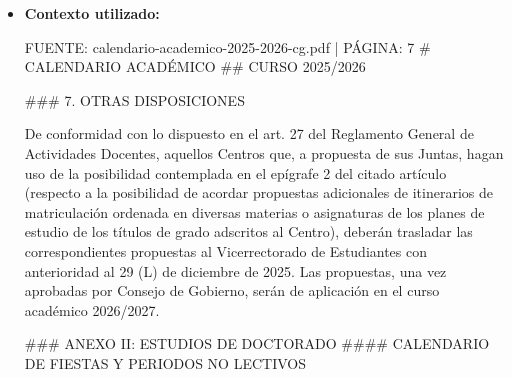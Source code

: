 \documentclass{article}
\begin{document}
\begin{itemize}
\begin{itemize}
                En el mes de abril de 2026, los días no lectivos o festivos en la Universidad de Sevilla debido a la conmemoración de la Semana Santa y la Feria de Abril son los siguientes:

                - \textbf{Del 29 de marzo al 5 de abril de 2026}: Estos días están considerados como no lectivos debido a la Semana Santa.
                - \textbf{Del 21 al 26 de abril de 2026}: Estos días están considerados como no lectivos debido a la Feria de Abril.

                Es importante tener en cuenta que estas fechas pueden estar sujetas a cambios o ajustes según las disposiciones específicas de la Universidad de Sevilla o las autoridades competentes. Sin embargo, según el calendario académico proporcionado, estas son las fechas establecidas para el curso 2025/2026.
          \item \textbf{Contexto utilizado:}
                \begin{scriptsize}
                  FUENTE: calendario-academico-2025-2026-cg.pdf | PÁGINA: 7
                  \# CALENDARIO ACADÉMICO
                  \#\# CURSO 2025/2026

                  \#\#\# 7. OTRAS DISPOSICIONES

                  De conformidad con lo dispuesto en el art. 27 del Reglamento General de Actividades Docentes, aquellos Centros que, a propuesta de sus Juntas, hagan uso de la posibilidad contemplada en el epígrafe 2 del citado artículo (respecto a la posibilidad de acordar propuestas adicionales de itinerarios de matriculación ordenada en diversas materias o asignaturas de los planes de estudio de los títulos de grado adscritos al Centro), deberán trasladar las correspondientes propuestas al Vicerrectorado de Estudiantes con anterioridad al 29 (L) de diciembre de 2025. Las propuestas, una vez aprobadas por Consejo de Gobierno, serán de aplicación en el curso académico 2026/2027.

                  \#\#\# ANEXO II: ESTUDIOS DE DOCTORADO
                  \#\#\#\# CALENDARIO DE FIESTAS Y PERIODOS NO LECTIVOS


\end{scriptsize}
\end{itemize}
\end{itemize}
\end{document}
